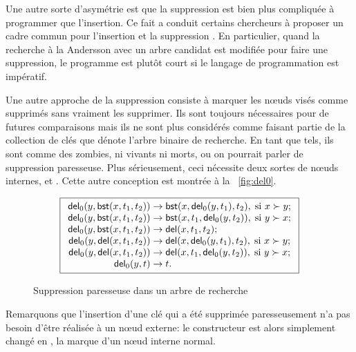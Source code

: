 Une autre sorte d'asymétrie est que la suppression est bien plus
compliquée à programmer que l'insertion. Ce fait a conduit certains
chercheurs à proposer un cadre commun pour l'insertion et la
suppression \citep{Andersson_1991,Hinze_2002}. En particulier, quand
la recherche à la Andersson avec un arbre candidat est modifiée pour
faire une suppression, le programme est plutôt court si le langage de
programmation est impératif.

Une autre approche de la suppression consiste à marquer les n{\oe}uds
visés comme supprimés sans vraiment les supprimer. Ils sont toujours
nécessaires pour de futures comparaisons mais ils ne sont plus
considérés comme faisant partie de la collection de clés que dénote
l'arbre binaire de recherche. En tant que tels, ils sont comme des
zombies, ni vivants ni morts, ou on pourrait parler de suppression
paresseuse. Plus sérieusement, ceci nécessite deux sortes de n{\oe}uds
internes,  et . Cette
autre conception est montrée à la \fig~\vref{fig:del0}.
\begin{figure}
\begin{equation*}
\boxed{
\begin{array}{r@{\;}l@{\;}l}
  \fun{del}_0(y,\fun{bst}(x,t_1,t_2)) & \rightarrow &
  \fun{bst}(x,\fun{del}_0(y,t_1),t_2),\; \text{si \(x \succ y\)};\\
\fun{del}_0(y,\fun{bst}(x,t_1,t_2)) & \rightarrow &
  \fun{bst}(x,t_1,\fun{del}_0(y,t_2)),\; \text{si \(y \succ x\)};\\
\fun{del}_0(y,\fun{bst}(x,t_1,t_2)) & \rightarrow &
  \fun{del}(x,t_1,t_2);\\
\fun{del}_0(y,\fun{del}(x,t_1,t_2)) & \rightarrow &
  \fun{del}(x,\fun{del}_0(y,t_1),t_2),\; \text{si \(x \succ y\)};\\
\fun{del}_0(y,\fun{del}(x,t_1,t_2)) & \rightarrow &
  \fun{del}(x,t_1,\fun{del}_0(y,t_2)),\; \text{si \(y \succ x\)};\\
\fun{del}_0(y,t) & \rightarrow & t.\\
\end{array}}
\end{equation*}
\caption{Suppression paresseuse dans un arbre de recherche\label{fig:del0}}
\end{figure}
Remarquons que l'insertion d'une clé qui a été supprimée
paresseusement n'a pas besoin d'être réalisée à un n{\oe}ud externe:
le constructeur  est alors simplement changé en
, la marque d'un n{\oe}ud interne normal.

